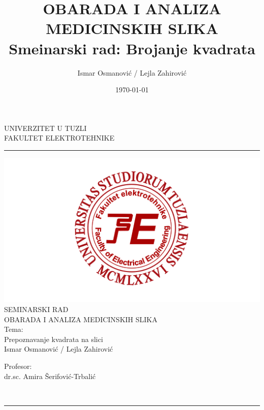 \documentclass[a4paper,12pt]{article}
\title{OBARADA I ANALIZA MEDICINSKIH SLIKA \\ Smeinarski rad: Brojanje kvadrata}
\author{Ismar Osmanović / Lejla Zahirović}
\date{\today}
\begin{document}
\begin{center}
\thispagestyle{empty}
\large{UNIVERZITET U TUZLI \\ FAKULTET ELEKTROTEHNIKE}

\noindent\rule[7pt]{\linewidth}{0.4pt}


  \includegraphics[width=0.7\linewidth]{img/fet_logo.png}
\vspace{3cm}\\
{\fontsize{34pt}{28pt}\selectfont SEMINARSKI RAD}\\
\large{OBARADA I ANALIZA MEDICINSKIH SLIKA}\\
\vspace{2cm}
\Huge{Tema:}\\
\Huge{Prepoznavanje kvadrata na slici}\\
\vspace{0.5cm}
\large{Ismar Osmanović / Lejla Zahirović}
\end{center}

\vfill
\noindent\hfill
\begin{minipage}[t]{0.33\textwidth}
 Profesor:\\
dr.sc. Amira Šerifović-Trbalić
\end{minipage}
\\

\noindent\rule[7pt]{\linewidth}{0.4pt}

\newpage
\thispagestyle{empty}
\tableofcontents
\newpage
{} 
\end{document}
